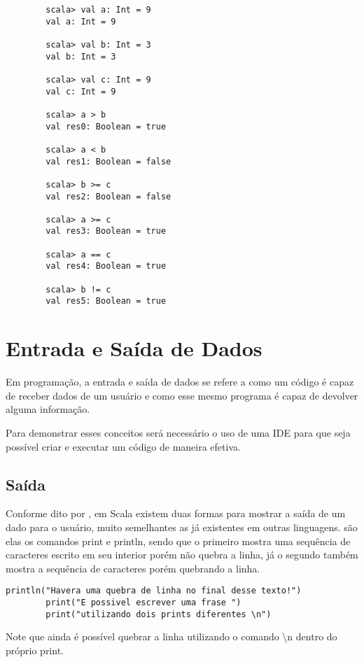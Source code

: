 	\begin{lstlisting}
		scala> val a: Int = 9
		val a: Int = 9
		
		scala> val b: Int = 3
		val b: Int = 3
		
		scala> val c: Int = 9
		val c: Int = 9
		
		scala> a > b
		val res0: Boolean = true
		
		scala> a < b
		val res1: Boolean = false
		
		scala> b >= c
		val res2: Boolean = false
		
		scala> a >= c
		val res3: Boolean = true
		
		scala> a == c
		val res4: Boolean = true
		
		scala> b != c
		val res5: Boolean = true
	\end{lstlisting}

	\section{Entrada e Sa\'{i}da de Dados}
	
	Em programa\c{c}\~{a}o, a entrada e sa\'{i}da de dados se refere a como um c\'{o}digo \'{e} capaz de receber dados de um usu\'{a}rio e como esse mesmo programa \'{e} capaz de devolver alguma informação.
	
	Para demonstrar esses conceitos ser\'{a} necess\'{a}rio o uso de uma IDE para que seja poss\'{i}vel criar e executar um c\'{o}digo de maneira efetiva.
	
	\subsection{Sa\'{i}da}
	
	Conforme dito por \cite{Odersky}, em Scala existem duas formas para mostrar a sa\'{i}da de um dado para o usu\'{a}rio, muito semelhantes as já existentes em outras linguagens. s\~{a}o elas os comandos print e println, sendo que o primeiro mostra uma sequ\^{e}ncia de caracteres escrito em seu interior por\'{e}m não quebra a linha, já o segundo tamb\'{e}m mostra a sequ\^{e}ncia de caracteres por\'{e}m quebrando a linha.
	
	\begin{lstlisting}[breaklines]
		println("Havera uma quebra de linha no final desse texto!")
		print("E possivel escrever uma frase ")
		print("utilizando dois prints diferentes \n")
	\end{lstlisting}
	
	Note que ainda \'{e} poss\'{i}vel quebrar a linha utilizando o comando \textbackslash n dentro do próprio print.
	
